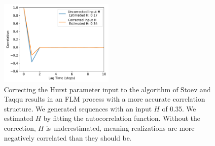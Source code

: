\documentclass{article}
\begin{document}
  \begin{figure}
  \centering
  \includegraphics[width=0.5\textwidth]{hurst_correction.pdf}
  \caption{Correcting the Hurst parameter input to the algorithm of Stoev and Taqqu
  results in an FLM process with a more accurate correlation structure. We generated
  sequences with an input $H$ of 0.35. We estimated $H$ by fitting the autocorrelation
  function. Without the correction, $H$ is underestimated, meaning realizations are 
  more negatively correlated than they should be.}\label{fig:hurst_correction}
  \end{figure}

  \clearpage
  
\end{document}
